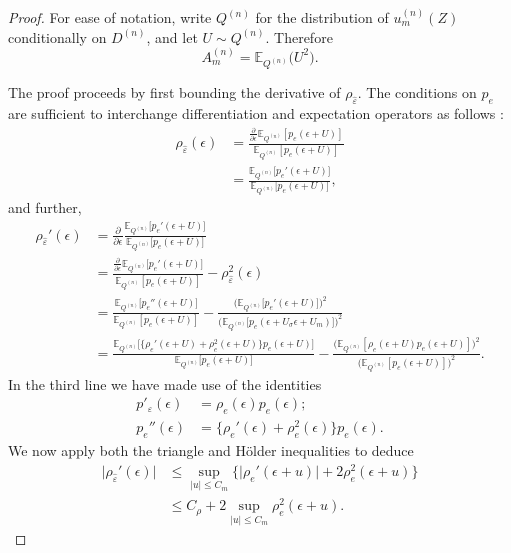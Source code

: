 \documentclass[aos]{imsart}
\newcommand{\E}{\mathbb{E}}
\begin{document}
	\begin{proof}
		For ease of notation, write $Q^{(n)}$ for the distribution of $u_m^{(n)}(Z)$ conditionally on $D^{(n)}$, and let $U\sim Q^{(n)}$. Therefore \begin{equation*}
			A_m^{(n)} = \E_{Q^{(n)}} \big(U^2\big).
		\end{equation*}
		
		The proof proceeds by first bounding the derivative of $\rho_{\hat\varepsilon}$. The conditions on $p_{e}$ are sufficient to interchange differentiation and expectation operators as follows \citep[Thm.~20.4]{AliprantisAnalysis}:
		\begin{align*}
			\rho_{\hat\varepsilon}(\epsilon)  &= \frac{\frac{\partial}{\partial \epsilon}\E_{Q^{(n)}}[p_{e}(\epsilon + U)]}{\E_{Q^{(n)}}[p_{e}(\epsilon + U)]}\\
			&=  \frac{\E_{Q^{(n)}}\big[p_{e}'(\epsilon + U) \big]}{\E_{Q^{(n)}}[p_{e}(\epsilon + U) \big]},
		\end{align*}
		and further,
		\begin{align*}
			\rho_{\hat\varepsilon}'(\epsilon)  &=  \frac{\partial}{\partial \epsilon} \frac{\E_{Q^{(n)}}\big[p_{e}'(\epsilon + U) \big]}{\E_{Q^{(n)}}[p_{e}(\epsilon + U) \big]}\\
			&=  \frac{\frac{\partial}{\partial \epsilon} \E_{Q^{(n)}}\big[p_{e}'(\epsilon + U) \big]}{\E_{Q^{(n)}}[p_{e}(\epsilon + U) ]} - \rho_{\hat\varepsilon}^2(\epsilon)\\
			&= \frac{\E_{Q^{(n)}}\big[ p_{e}''(\epsilon + U) \big]}{\E_{Q^{(n)}}[ p_{e}(\epsilon + U)]} - \frac{\Big(\E_{Q^{(n)}}\big[ p_{e}'(\epsilon + U) \big]\Big)^2}{\Big(\E_{Q^{(n)}}\big[ p_{e}(\epsilon+U_\sigma \epsilon + U_m) \big]\Big)^2} \\
			&=\frac{\E_{Q^{(n)}}\big[ \big\{\rho_{e}'(\epsilon + U) + \rho_{e}^2(\epsilon + U)\big\} p_{e}(\epsilon + U) \big]}{\E_{Q^{(n)}}\big[ p_{e}(\epsilon + U) \big]} - \frac{\big(\E_{Q^{(n)}}[ \rho_{e}(\epsilon + U) p_{e}(\epsilon + U)]\big)^2}{\big(\E_{Q^{(n)}}[ p_{e}(\epsilon + U) ]\big)^2}.
		\end{align*}
		In the third line we have made use of the identities \begin{align*}
			p'_\varepsilon(\epsilon) &= \rho_{e}(\epsilon)p_{e}(\epsilon);\\
			p_{e}''(\epsilon)&= \big\{\rho_{e}'(\epsilon)  +\rho_{e}^2(\epsilon)\big\} p_{e}(\epsilon).
		\end{align*}
		We now apply both the triangle and H\"older inequalities to deduce
		\begin{align*}
			\big| \rho_{\hat\varepsilon}'(\epsilon) \big|&\leq \sup_{|u|\leq C_m} \big\{ \big|\rho_{e}'(\epsilon + u)\big| + 2\rho_{e}^2 (\epsilon + u)\big\}\\
			&\leq C_\rho + 2 \sup_{|u|\leq C_m} \rho_{e}^2 (\epsilon + u).
		\end{align*}
		

\end{proof}
\end{document}
